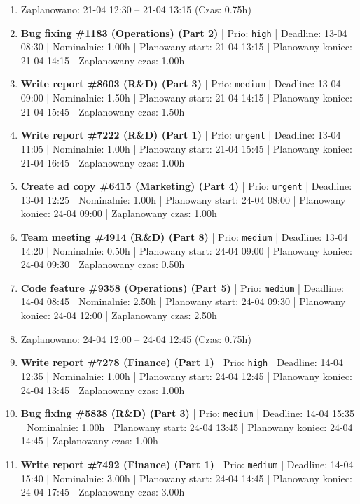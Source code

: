 {\begin{enumerate}
  \item [\textbf{PRZERWA}] Zaplanowano: 21-04 12:30 -- 21-04 13:15 (Czas: 0.75h)
  \item [\textbf{14613}] \textbf{Bug fixing \#1183 (Operations) (Part 2)} | Prio: \texttt{high} | Deadline: 13-04 08:30 | Nominalnie: 1.00h | Planowany start: 21-04 13:15 | Planowany koniec: 21-04 14:15 | Zaplanowany czas: 1.00h
  \item [\textbf{14634}] \textbf{Write report \#8603 (R\&D) (Part 3)} | Prio: \texttt{medium} | Deadline: 13-04 09:00 | Nominalnie: 1.50h | Planowany start: 21-04 14:15 | Planowany koniec: 21-04 15:45 | Zaplanowany czas: 1.50h
  \item [\textbf{14601}] \textbf{Write report \#7222 (R\&D) (Part 1)} | Prio: \texttt{urgent} | Deadline: 13-04 11:05 | Nominalnie: 1.00h | Planowany start: 21-04 15:45 | Planowany koniec: 21-04 16:45 | Zaplanowany czas: 1.00h
  \item [\textbf{14602}] \textbf{Create ad copy \#6415 (Marketing) (Part 4)} | Prio: \texttt{urgent} | Deadline: 13-04 12:25 | Nominalnie: 1.00h | Planowany start: 24-04 08:00 | Planowany koniec: 24-04 09:00 | Zaplanowany czas: 1.00h
  \item [\textbf{14638}] \textbf{Team meeting \#4914 (R\&D) (Part 8)} | Prio: \texttt{medium} | Deadline: 13-04 14:20 | Nominalnie: 0.50h | Planowany start: 24-04 09:00 | Planowany koniec: 24-04 09:30 | Zaplanowany czas: 0.50h
  \item [\textbf{14661}] \textbf{Code feature \#9358 (Operations) (Part 5)} | Prio: \texttt{medium} | Deadline: 14-04 08:45 | Nominalnie: 2.50h | Planowany start: 24-04 09:30 | Planowany koniec: 24-04 12:00 | Zaplanowany czas: 2.50h
  \item [\textbf{PRZERWA}] Zaplanowano: 24-04 12:00 -- 24-04 12:45 (Czas: 0.75h)
  \item [\textbf{14609}] \textbf{Write report \#7278 (Finance) (Part 1)} | Prio: \texttt{high} | Deadline: 14-04 12:35 | Nominalnie: 1.00h | Planowany start: 24-04 12:45 | Planowany koniec: 24-04 13:45 | Zaplanowany czas: 1.00h
  \item [\textbf{14637}] \textbf{Bug fixing \#5838 (R\&D) (Part 3)} | Prio: \texttt{medium} | Deadline: 14-04 15:35 | Nominalnie: 1.00h | Planowany start: 24-04 13:45 | Planowany koniec: 24-04 14:45 | Zaplanowany czas: 1.00h
  \item [\textbf{14642}] \textbf{Write report \#7492 (Finance) (Part 1)} | Prio: \texttt{medium} | Deadline: 14-04 15:40 | Nominalnie: 3.00h | Planowany start: 24-04 14:45 | Planowany koniec: 24-04 17:45 | Zaplanowany czas: 3.00h

\end{enumerate}}
